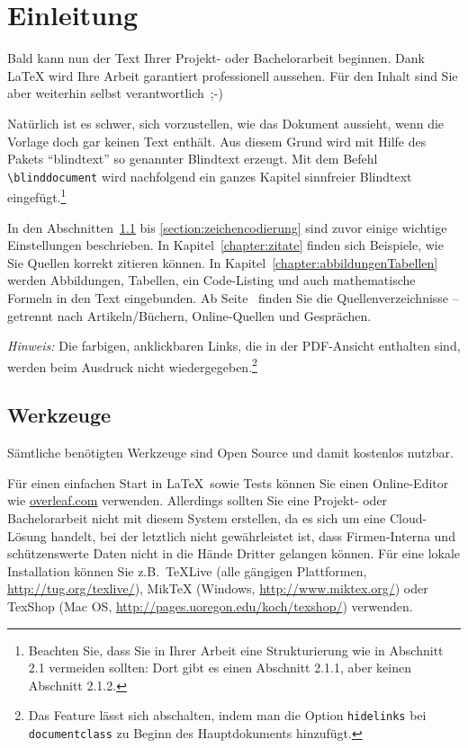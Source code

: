 \chapter{Einleitung}

Bald kann nun der Text Ihrer Projekt- oder Bachelorarbeit beginnen. Dank LaTeX wird Ihre Arbeit garantiert professionell aussehen. Für den Inhalt sind Sie aber weiterhin selbst verantwortlich~\mbox{;-)}

Natürlich ist es schwer, sich vorzustellen, wie das Dokument aussieht, wenn die Vorlage doch gar keinen Text enthält. Aus diesem Grund wird mit Hilfe des Pakets \enquote{blindtext} so genannter Blindtext erzeugt. Mit dem Befehl \verb|\blinddocument| wird nachfolgend ein ganzes Kapitel sinnfreier Blindtext eingefügt.\footnote{Beachten Sie, dass Sie in Ihrer Arbeit eine Strukturierung wie in Abschnitt 2.1 vermeiden sollten: Dort gibt es einen Abschnitt 2.1.1, aber keinen Abschnitt 2.1.2.} 

In den Abschnitten~\ref{section:werkzeuge} bis \ref{section:zeichencodierung} sind zuvor einige wichtige Einstellungen beschrieben. In Kapitel~\ref{chapter:zitate} finden sich Beispiele, wie Sie Quellen korrekt zitieren können. In Kapitel~\ref{chapter:abbildungenTabellen} werden Abbildungen, Tabellen, ein Code-Listing und auch mathematische Formeln in den Text eingebunden. Ab Seite~\pageref{chapter:quellen} finden Sie die Quellenverzeichnisse -- getrennt nach Artikeln/Büchern, Online-Quellen und Gesprächen. 

\emph{Hinweis:} Die farbigen, anklickbaren Links, die in der PDF-Ansicht enthalten sind, werden beim Ausdruck nicht wiedergegeben.\footnote{Das Feature lässt sich abschalten, indem man die Option \texttt{hidelinks} bei \texttt{documentclass} zu Beginn des Hauptdokuments hinzufügt.}

\section{Werkzeuge}\label{section:werkzeuge}

Sämtliche benötigten Werkzeuge sind Open Source und damit kostenlos nutzbar.

Für einen einfachen Start in \LaTeX\ sowie Tests können Sie einen Online-Editor wie \url{overleaf.com} verwenden. Allerdings sollten Sie eine Projekt- oder Bachelorarbeit nicht mit diesem System erstellen, da es sich um eine Cloud-Lösung handelt, bei der letztlich nicht gewährleistet ist, dass Firmen-Interna und schützenswerte Daten nicht in die Hände Dritter gelangen können. Für eine lokale Installation können Sie z.B.\ TeXLive (alle gängigen Plattformen, \url{http://tug.org/texlive/}), MikTeX (Windows, \url{http://www.miktex.org/}) oder TexShop (Mac OS, \url{http://pages.uoregon.edu/koch/texshop/}) verwenden.

